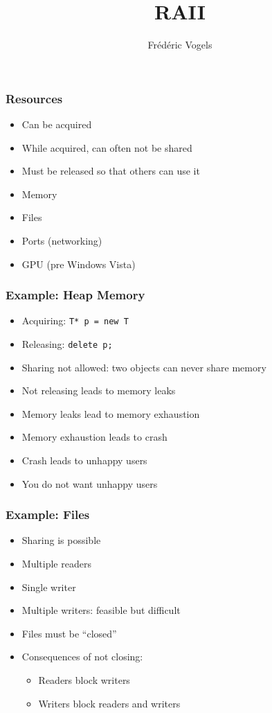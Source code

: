 \documentclass{../ucll-slides}
\title{RAII}
\author{Fr\'ed\'eric Vogels}
\begin{document}
\begin{frame}
  \titlepage
\end{frame}

\begin{frame}
  \frametitle{Resources}
  \begin{itemize}
    \item Can be acquired
    \item While acquired, can often not be shared
    \item Must be released so that others can use it
  \end{itemize}
  \vskip5mm
  \begin{itemize}
    \item Memory
    \item Files
    \item Ports (networking)
    \item GPU (pre Windows Vista)
  \end{itemize}
\end{frame}

\begin{frame}
  \frametitle{Example: Heap Memory}
  \begin{itemize}
    \item Acquiring: {\tt T* p = new T}
    \item Releasing: {\tt delete p;}
    \item Sharing not allowed: two objects can never share memory
    \item Not releasing leads to memory leaks 
    \item Memory leaks lead to memory exhaustion
    \item Memory exhaustion leads to crash
    \item Crash leads to unhappy users
    \item You do not want unhappy users
  \end{itemize}
\end{frame}

\begin{frame}
  \frametitle{Example: Files}
  \begin{itemize}
    \item Sharing is possible
    \item Multiple readers
    \item Single writer
    \item Multiple writers: feasible but difficult
    \item Files must be ``closed''
    \item Consequences of not closing:
          \begin{itemize}
            \item Readers block writers
            \item Writers block readers and writers
          \end{itemize}
  \end{itemize}
\end{frame}
\end{document}
